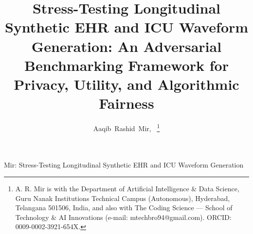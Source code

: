 \documentclass[journal]{IEEEtran}
\begin{document}
\title{Stress-Testing Longitudinal Synthetic EHR and ICU Waveform Generation: An Adversarial Benchmarking Framework for Privacy, Utility, and Algorithmic Fairness}

\author{Aaqib~Rashid~Mir,~%
\thanks{A. R. Mir is with the Department of Artificial Intelligence \& Data Science, Guru Nanak Institutions Technical Campus (Autonomous), Hyderabad, Telangana 501506, India, and also with The Coding Science --- School of Technology \& AI Innovations (e-mail: mtechbro94@gmail.com). ORCID: 0009-0002-3921-654X.}%
}

%
{Mir: Stress-Testing Longitudinal Synthetic EHR and ICU Waveform Generation}

\maketitle
\end{document}
